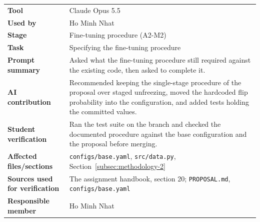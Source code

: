 \noindent\begin{minipage}{\textwidth}
\begin{tabularx}{\textwidth}{lX}
\hline
\textbf{Tool} & Claude Opus 5.5 \\
\textbf{Used by} & Ho Minh Nhat \\
\textbf{Stage} & Fine-tuning procedure (A2-M2) \\
\textbf{Task} & Specifying the fine-tuning procedure \\
\textbf{Prompt summary} & Asked what the fine-tuning procedure still required against the existing code, then asked to complete it. \\
\textbf{AI contribution} & Recommended keeping the single-stage procedure of the proposal over staged unfreezing, moved the hardcoded flip probability into the configuration, and added tests holding the committed values. \\
\textbf{Student verification} & Ran the test suite on the branch and checked the documented procedure against the base configuration and the proposal before merging. \\
\textbf{Affected files/sections} & \texttt{configs/base.yaml}, \texttt{src/data.py}, Section~\ref{subsec:methodology-2} \\
\textbf{Sources used for verification} & The assignment handbook, section 20; \texttt{PROPOSAL.md}, \texttt{configs/base.yaml} \\
\textbf{Responsible member} & Ho Minh Nhat \\
\hline
\end{tabularx}
\end{minipage}

